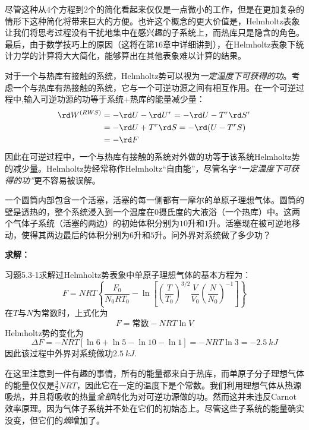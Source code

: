 尽管这种从$4$个方程到$2$个的简化看起来仅仅是一点微小的工作，但是在更加复杂的情形下这种简化将带来巨大的方便。也许这个概念的更大价值是，Helmholtz表象让我们将思考过程没有干扰地集中在感兴趣的子系统上，而热库只是隐含的角色。最后，由于数学技巧上的原因（这将在第$16$章中详细讲到），在Helmholtz表象下统计力学的计算将大大简化，能够算出在其他表象难以计算的结果。

对于一个与热库有接触的系统，Helmholtz势可以视为{\it 一定温度下可获得的功}。考虑一个与热库有热接触的系统，它与一个可逆功源之间有相互作用。在一个可逆过程中,输入可逆功源的功等于系统+热库的能量减少量：
\begin{align}
\label{equ6.25}
	\rd W^{(RWS)} &= -\rd U - \rd U^r = -\rd U - T^r \rd S^r \\
\label{equ6.26}
	&= -\rd U + T^r \rd S = -\rd (U - T^r S) \\
\label{equ6.27}
    &= -\rd F
\end{align}
因此在可逆过程中，一个与热库有接触的系统对外做的功等于该系统Helmholtz势的减少量。Helmholtz势经常称作Helmholtz“自由能”，尽管名字{\it “一定温度下可获得的功”}更不容易被误解。

\begin{example}
一个圆筒内部包含一个活塞，活塞的每一侧都有一摩尔的单原子理想气体。圆筒的壁是透热的，整个系统浸入到一个温度在$0$摄氏度的大液浴（一个热库）中。这两个气体子系统（活塞的两边）的初始体积分别为$10$升和$1$升。活塞现在被可逆地移动，使得其两边最后的体积分别为$6$升和$5$升。问外界对系统做了多少功？

{\bf 求解：}

习题5.3-1求解过Helmholtz势表象中单原子理想气体的基本方程为：
\begin{equation*}
	F = NRT \left\{\frac{F_0}{N_0RT_0} - \ln \left[\left(\frac{T}{T_0}\right)^{3/2}\frac{V}{V_0}\left(\frac{N}{N_0}\right)^{-1} \right]\right\}
\end{equation*}
在$T$与$N$为常数时，上式化为
\begin{equation*}
	F = \text{常数} - NRT \ln V
\end{equation*}
Helmholtz势的变化为
\begin{equation*}
	\Delta F = -NRT [\ln 6 + \ln 5 - \ln 10 - \ln1] = -NRT \ln 3 = -\SI{2.5}{kJ}
\end{equation*}
因此该过程中外界对系统做功$\SI{2.5}{kJ}$.
\end{example}

在这里注意到一件有趣的事情，所有的能量都来自于热库，而单原子分子理想气体的能量仅仅是$\frac{3}{2}NRT$，因此它在一定的温度下是个常数。我们利用理想气体从热源吸热，并且将吸收的热量{\it 全部}转化为对可逆功源做的功。然而这并未违反Carnot效率原理。因为气体子系统并不处在它们的初始态上。尽管这些子系统的能量确实没变，但它们的{\it 熵}增加了。

